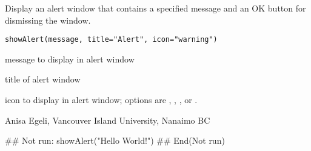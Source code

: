 \documentclass[letterpaper]{book}
\begin{document}
\begin{Description}\relax
Display an alert window that contains a specified message and 
an OK button for dismissing the window.
\end{Description}
\begin{Usage}
\begin{verbatim}
showAlert(message, title="Alert", icon="warning")
\end{verbatim}
\end{Usage}
\begin{Arguments}
\begin{ldescription}
\item[\code{message}] message to display in alert window
\item[\code{title}] title of alert window
\item[\code{icon}] icon to display in alert window; options are 
, , , or .
\end{ldescription}
\end{Arguments}
\begin{Author}\relax
Anisa Egeli, Vancouver Island University, Nanaimo BC
\end{Author}
\begin{SeeAlso}\relax
{}
\end{SeeAlso}
\begin{Examples}
\begin{ExampleCode}
## Not run: 
showAlert("Hello World!")
## End(Not run)
\end{ExampleCode}
\end{Examples}
\end{document}
